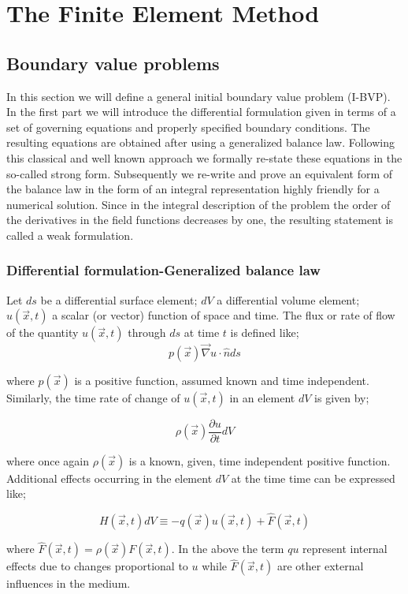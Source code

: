 \graphicspath{ {./img/TheFEM/} }
\chapter{The Finite Element Method}
\section{Boundary value problems}
In this section we will define a general initial boundary value problem (I-BVP). In the first part we will introduce the differential formulation given in terms of a set of governing equations and properly specified boundary conditions. The resulting equations are obtained after using a generalized balance law. Following this classical and well known approach we formally re-state these equations in the so-called strong form. Subsequently we re-write and prove an equivalent form of the balance law in the form of an integral representation highly friendly for a numerical solution. Since in the integral description of the problem the order of the derivatives in the field functions decreases by one, the resulting statement is called a weak formulation. 
\subsection{Differential formulation-Generalized balance law}
Let $ds$ be a differential surface element; $dV$ a differential volume element; $u(\vec x,t)$ a scalar (or vector) function of space and time.
The flux or rate of flow of the quantity $u(\vec x,t)$ through $ds$ at time $t$ is defined like;
\[p(\vec x)\vec \nabla u \cdot \hat nds\]

where $p(\vec x)$ is a positive function, assumed known and time independent. Similarly, the time rate of change of $u(\vec x,t)$ in an element $dV$ is given by;

\[\rho (\vec x)\frac{{\partial u}}{{\partial t}}dV\]

where once again $\rho (\vec x)$ is a known, given, time independent positive function. Additional effects occurring in the element $dV$ at the time time can be expressed like;

\[H(\vec x,t)dV \equiv  - q(\vec x)u(\vec x,t) + \hat F(\vec x,t)\]

where $\hat F(\vec x,t) = \rho (\vec x)F(\vec x,t)$. In the above the term $qu$ represent internal effects due to changes proportional to $u$ while $\hat F(\vec x,t)$ are other external influences in the medium.

